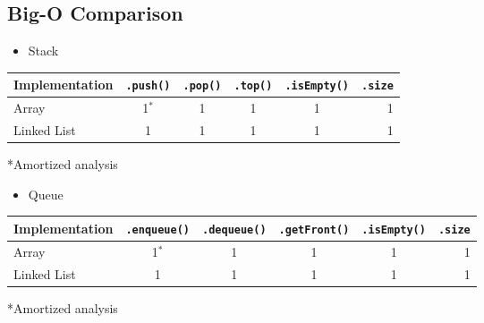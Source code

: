 \documentclass[10pt]{article}
\begin{document}
\subsection*{Big-O Comparison}
\begin{itemize}
    \item Stack
\end{itemize}
\begin{center}
    \begin{tabular}{lccccr} \toprule
        Implementation & \texttt{.push()} & \texttt{.pop()} & \texttt{.top()} & \texttt{.isEmpty()} & \texttt{.size} \\ \midrule
        Array & 1$^*$ & 1 & 1 & 1 & 1 \\
        Linked List & 1 & 1 & 1 & 1 & 1 \\ \bottomrule
    \end{tabular}
    \begin{center}*Amortized analysis\end{center}
\end{center}
\begin{itemize}
    \item Queue
\end{itemize}
\begin{center}
    \begin{tabular}{lccccr} \toprule
        Implementation & \texttt{.enqueue()} & \texttt{.dequeue()} & \texttt{.getFront()} & \texttt{.isEmpty()} & \texttt{.size} \\ \midrule
        Array & 1$^*$ & 1 & 1 & 1 & 1 \\
        Linked List & 1 & 1 & 1 & 1 & 1 \\ \bottomrule
    \end{tabular}
    \begin{center}*Amortized analysis\end{center}
\end{center}
\end{document}

